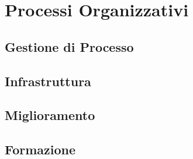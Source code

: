 \chapter{Processi Organizzativi}

\section{Gestione di Processo}
\section{Infrastruttura}
\section{Miglioramento}
\section{Formazione}